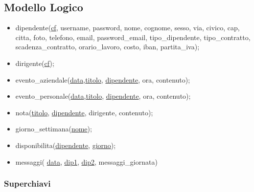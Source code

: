 \documentclass[paper=a4, fontsize=11pt]{scrartcl} %
\numberwithin{equation}{section} %
\numberwithin{figure}{section} %
\numberwithin{table}{section} %
\begin{document}
    \begin{figure}[htbp]
        \centering
        \qquad\qquad
      \end{figure}

\subsection{Modello Logico}
\begin{itemize}
  \item dipendente(\underline{cf}, username, password, nome, cognome, sesso, via, civico, cap, citta, foto, telefono,
      email, password\_email, tipo\_dipendente, tipo\_contratto, scadenza\_contratto, orario\_lavoro, costo, iban, partita\_iva);
  \item dirigente(\underline{cf});
  \item evento\_aziendale(\underline{data},\underline{titolo}, \underline{dipendente}, ora, contenuto);
  \item evento\_personale(\underline{data},\underline{titolo}, \underline{dipendente}, ora, contenuto);
  \item nota(\underline{titolo}, \underline{dipendente}, dirigente, contenuto);
  \item giorno\_settimana(\underline{nome});
  \item disponibilita(\underline{dipendente}, \underline{giorno});
  \item messaggi( \underline{data}, \underline{dip1}, \underline{dip2}, messaggi\_giornata)

\end{itemize}

\subsubsection*{Superchiavi}
\end{document}
